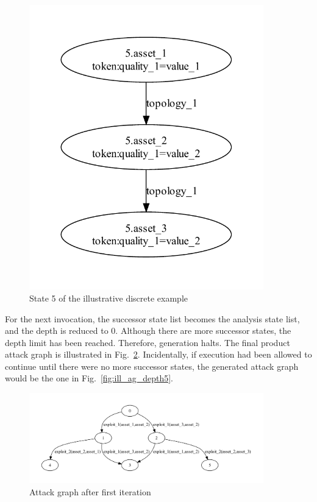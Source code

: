 \begin{figure}
\includegraphics[width=4in]{ag_illustrative_simple/nm_state5}
\caption{State 5 of the illustrative discrete example}
\label{fig:ill_topology_5}
\end{figure}

For the next invocation, the successor state list becomes the analysis state
list, and the depth is reduced to 0.  Although there are more successor states,
the depth limit has been reached. Therefore, generation halts. The final product
attack graph is illustrated in Fig.~\ref{fig:ill_ag_depth2}. Incidentally, if
execution had been allowed to continue until there were no more successor states,
the generated attack graph would be the one in Fig.~\ref{fig:ill_ag_depth5}.

\begin{figure}
\includegraphics[width=4in]{ag_illustrative_simple/ag_depth2}
\caption{Attack graph after first iteration}
\label{fig:ill_ag_depth2}
\end{figure}

